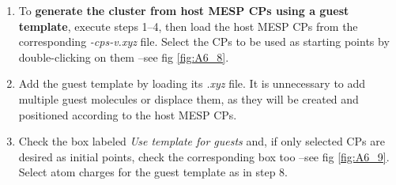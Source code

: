 \documentclass[10pt]{article}
\begin{document}
\begin{enumerate}
\item To {\bf generate the cluster from host MESP CPs using a guest template}, 
execute steps 1--4, then load the host MESP CPs from the corresponding
{\it *-cps-v.xyz} file. Select the CPs to be used as starting points
by double-clicking on them --see fig \ref{fig:A6_8}.

\item Add the guest template by loading its
{\it *.xyz} file. It is unnecessary to add multiple guest molecules or displace them,
as they will be created and positioned according to the host MESP CPs.

\item Check the box labeled {\it Use template for guests} and, if
only selected CPs are desired as initial points, check the corresponding box too
--see fig \ref{fig:A6_9}. Select atom charges for the guest template as in step 8.


\end{enumerate}
\end{document}

